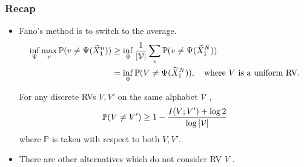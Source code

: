 \documentclass[10pt,xcolor={usenames,dvipsnames,table},aspectratio=169]{beamer}
\begin{document}
\begin{frame}
    \frametitle{Recap}
    \begin{itemize}
        \item Fano's method is to switch to the average.
            \begin{align*}
\inf_{\Psi} \max_{v} \mathbb{P}(v \neq \Psi(\widetilde{X}_1^{n}))
            &\geq \inf_{\Psi} \dfrac{1}{\left\lvert\mathcal{V}\right\rvert} \sum_{v} \mathbb{P}(v \neq \Psi(\widetilde{X}_1^{N})) \\
            &= \inf_{\Psi} \mathbb{P} (V \neq \Psi(\widetilde{X}_1^{N})), \quad \text{where $V$ is a uniform RV.}
            \end{align*} 
    \begin{lemma}
     For any discrete RVs $V, V'$ on the same alphabet  $\mathcal{V}$   ,
     \[
     \mathbb{P}(V \neq V') \geq 1- \dfrac{I(V;V') + \log 2}{\log \left\lvert\mathcal{V}\right\rvert}
     \] 
     where $ \mathbb{P}$ is taken with respect to both $V, V'$.
    \end{lemma}
    \item There are other alternatives which do not consider RV $V$  \citep{Tsybakov:1315296}.
    \end{itemize}
\end{frame}
\end{document}
